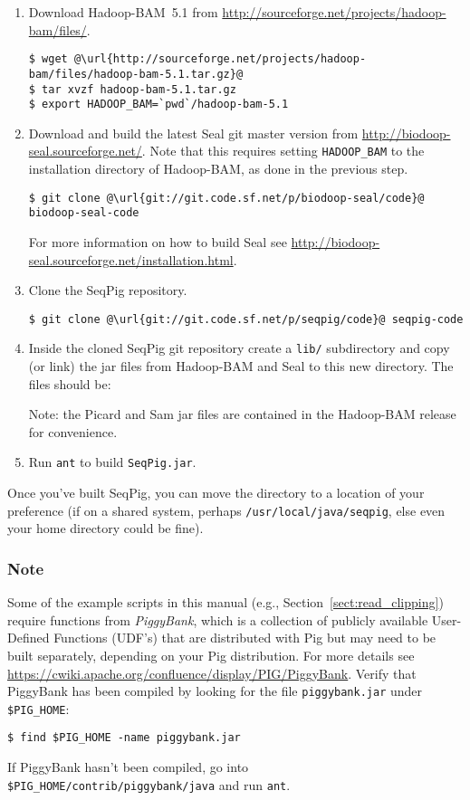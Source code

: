 \begin{enumerate}
\item Download Hadoop-BAM~5.1 from \url{http://sourceforge.net/projects/hadoop-bam/files/}.
\begin{lstlisting} 
$ wget @\url{http://sourceforge.net/projects/hadoop-bam/files/hadoop-bam-5.1.tar.gz}@
$ tar xvzf hadoop-bam-5.1.tar.gz
$ export HADOOP_BAM=`pwd`/hadoop-bam-5.1
\end{lstlisting}
\item Download and build the latest Seal git master version from
 \url{http://biodoop-seal.sourceforge.net/}. Note that this requires setting
 {\tt HADOOP\_BAM} to the installation directory of Hadoop-BAM, as done in the previous step.
\begin{lstlisting} 
$ git clone @\url{git://git.code.sf.net/p/biodoop-seal/code}@ biodoop-seal-code
\end{lstlisting}
For more information on how to build Seal see \url{http://biodoop-seal.sourceforge.net/installation.html}.
\item Clone the SeqPig repository.
\begin{lstlisting} 
$ git clone @\url{git://git.code.sf.net/p/seqpig/code}@ seqpig-code
\end{lstlisting}
\item Inside the cloned SeqPig git repository create a
{\tt lib/} subdirectory and copy (or link) the jar files
from Hadoop-BAM and Seal to this new directory.  The files should be:
%
Note: the Picard and Sam jar files are contained in the Hadoop-BAM release
for convenience.
\item Run {\tt ant} to build {\tt SeqPig.jar}.
\end{enumerate}

Once you've built SeqPig, you can move the directory to a location of your
preference (if on a shared system, perhaps {\tt /usr/local/java/seqpig}, else
even your home directory could be fine).

\subsubsection{Note}
\label{sect:piggybank_note}

Some of the example scripts in this manual (e.g.,
Section~\ref{sect:read_clipping}) require functions from \emph{PiggyBank},
which is a collection of publicly available User-Defined Functions (UDF's)
that are distributed with Pig but may need to be built separately, depending on
your Pig distribution.
For more details see
\url{https://cwiki.apache.org/confluence/display/PIG/PiggyBank}. Verify that
PiggyBank has been compiled by looking for the file {\tt piggybank.jar} under
{\tt \$PIG\_HOME}:
\begin{lstlisting} 
$ find $PIG_HOME -name piggybank.jar
\end{lstlisting}
If PiggyBank hasn't been compiled, go into {\tt
\$PIG\_HOME/contrib/piggybank/java} and run {\tt ant}.

